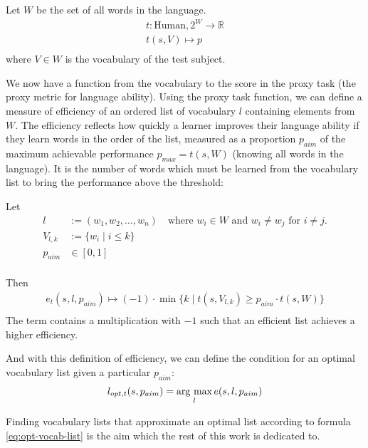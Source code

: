 Let $W$ be the set of all words in the language.
\begin{align*}
	t: \text{Human}, 2^{W}\to \mathbb{R} \\
	t (s, V) \mapsto p                   \\
\end{align*}
where $V \in W$ is the vocabulary of the test subject.

We now have a function from the vocabulary to the score in the proxy task (the proxy metric for language ability).
Using the proxy task function, we can define a measure of efficiency of an ordered list of vocabulary $l$ containing elements from $W$.
The efficiency reflects how quickly a learner improves their language ability if they learn words in the order of the list, measured as a proportion $p_{aim}$ of the maximum achievable performance $p_{max} = t(s,W)$ (knowing all words in the language).
It is the number of words which must be learned from the vocabulary list to bring the performance above the threshold:

Let
\begin{align*}
	l        & := (w_1, w_2, \dots, w_n) \quad \text{where } w_i \in W \text{ and } w_i \neq w_j \text{ for } i \neq j. \\
	V_{l, k} & := \{w_i \mid i \leq k\}                                                                                 \\
	p_{aim}  & \in  [0, 1]                                                                                              \\
\end{align*}

Then
\begin{align*}
	e_{t}(s, l, p_{aim}) \mapsto ( -1 )  \cdot  \min\{ k \mid  t(s,  V_{l, k}) \geq p_{aim} \cdot t(s, W)\} \\
\end{align*}
The term contains a multiplication with $-1$ such that an efficient list achieves a higher efficiency.

And with this definition of efficiency, we can define the condition for an optimal vocabulary list given a particular $p_{aim}$:
\begin{align} \label{eq:opt-vocab-list}
	l_{opt, t} (s, p_{aim}) = \mathop{\rm arg~max}\limits_{l} e(s, l, p_{aim})
\end{align}

Finding vocabulary lists that approximate an optimal list according to formula \ref{eq:opt-vocab-list} is the aim which the rest of this work is dedicated to.


